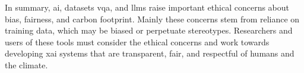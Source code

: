 







\begin{comment}
    Tell how this thesis uses the ethical information above when doing research.
\end{comment}

In summary, \gls{ai}, datasets \gls{vqa}, and \glspl{llm} raise important ethical concerns about bias, fairness, and carbon footprint. Mainly these concerns stem from reliance on training data, which may be biased or perpetuate stereotypes. 
Researchers and users of these tools must consider the ethical concerns and work towards developing \gls{xai} systems that are transparent, fair, and respectful of humans and the climate.
